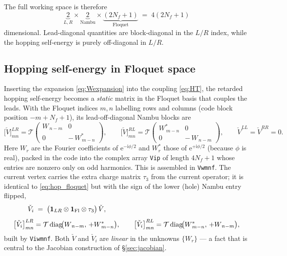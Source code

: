 \documentclass[11pt,a4paper]{article}
\newcommand{\id}{\mathbf{1}}          %
\newcommand{\ii}{\mathrm{i}}
\newcommand{\ee}{\mathrm{e}}
\newcommand{\tauz}{\tau_3}
\newcommand{\Wm}{W}
\begin{document}
The full working space is therefore
\begin{equation}
  \underbrace{2}_{L,R}\times
  \underbrace{2}_{\text{Nambu}}\times
  \underbrace{(2N_f+1)}_{\text{Floquet}}
  \;=\; 4(2N_f+1)
\end{equation}
dimensional.  Lead-diagonal quantities are block-diagonal in the $L/R$ index,
while the hopping self-energy is purely off-diagonal in $L/R$.

\subsection{Hopping self-energy in Floquet space}
\label{sec:hop}

Inserting the expansion \eqref{eq:Wexpansion} into the coupling \eqref{eq:HT},
the retarded hopping self-energy becomes a \emph{static} matrix in the Floquet
basis that couples the leads.  With the Floquet indices $m,n$ labelling rows and
columns (code block position $-m+N_f+1$), its lead-off-diagonal Nambu blocks are
\begin{equation}
  \bigl[\check V\bigr]^{LR}_{mn} =
  \mathcal{T}
  \begin{pmatrix}
    \Wm_{\,n-m} & 0\\[2pt]
    0 & -\,\Wm^{*}_{\,m-n}
  \end{pmatrix},
  \qquad
  \bigl[\check V\bigr]^{RL}_{mn} =
  \mathcal{T}
  \begin{pmatrix}
    \Wm^{*}_{\,m-n} & 0\\[2pt]
    0 & -\,\Wm_{\,n-m}
  \end{pmatrix},
  \qquad
  \check V^{LL}=\check V^{RR}=0 .
  \label{eq:hop_floquet}
\end{equation}
Here $\Wm_r$ are the Fourier coefficients of $\ee^{-\ii\phi/2}$ and
$\Wm^*_{r}$ those of $\ee^{+\ii\phi/2}$ (because $\phi$ is real), packed in the
code into the complex array \texttt{Vip} of length $4N_f+1$ whose entries are
nonzero only on odd harmonics.  This is assembled in \texttt{Vwmnf}.  The current
vertex carries the extra charge matrix $\tauz$ from the current operator; it is
identical to \eqref{eq:hop_floquet} but with the sign of the lower (hole) Nambu
entry flipped,
\begin{equation}
  \begin{aligned}
  \check V_i &\;=\; \big(\id_{LR}\otimes\id_{\rm Fl}\otimes\tauz\big)\,\check V ,\\[4pt]
  \bigl[\check V_i\bigr]^{LR}_{mn} &= \mathcal{T}\,\mathrm{diag}\!\big(\Wm_{\,n-m},\,+\Wm^{*}_{\,m-n}\big),
  \qquad
  \bigl[\check V_i\bigr]^{RL}_{mn} = \mathcal{T}\,\mathrm{diag}\!\big(\Wm^{*}_{\,m-n},\,+\Wm_{\,n-m}\big),
  \end{aligned}
  \label{eq:hop_vertex}
\end{equation}
built by \texttt{Viwmnf}.  Both $\check V$ and $\check V_i$ are \emph{linear} in
the unknowns $\{\Wm_r\}$ --- a fact that is central to the Jacobian construction
of \S\ref{sec:jacobian}.
\end{document}
